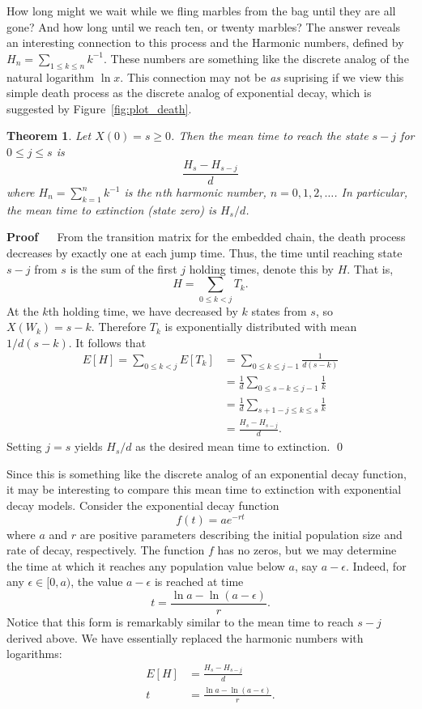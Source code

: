 \documentclass[12pt]{article}
\renewenvironment{proof}{%
\begin{adjustwidth}{\parindent}{\parindent}
{\bf Proof} \ \ 
}{\qed
\end{adjustwidth}}
\newtheorem{thm}{Theorem}[section]
\theoremstyle{definition}
\begin{document}
How long might we wait while we fling marbles from the bag until they are all
gone? And how long until we reach ten, or twenty marbles? The answer reveals an
interesting connection to this process and the Harmonic numbers, defined by
$H_n = \sum_{1 \leq k \leq n} k^{-1}$. These numbers are something like the
discrete analog of the natural logarithm $\ln{x}$. This connection may not be
\emph{as} suprising if we view this simple death process as the discrete analog
of exponential decay, which is suggested by Figure~\ref{fig:plot_death}.

\begin{thm}
    \label{thm:mean-death-time}
    Let $X(0) = s \geq 0$. Then the mean time to reach the state $s - j$ for $0
    \leq j \leq s$ is $$\frac{H_s - H_{s - j}}{d}$$ where $H_n = \sum_{k = 1}^n
    k^{-1}$ is the $n$th harmonic number, $n = 0, 1, 2, \dots$. In particular,
    the mean time to extinction (state zero) is $H_s/d$.
\end{thm}

\begin{proof}
From the transition matrix for the embedded chain, the death process decreases
by exactly one at each jump time. Thus, the time until reaching state $s - j$
from $s$ is the sum of the first $j$ holding times, denote this by $H$. That
is, $$H = \sum_{0 \leq k < j} T_k.$$ At the $k$th holding time, we have
decreased by $k$ states from $s$, so $X(W_k) = s - k$.  Therefore $T_k$ is
exponentially distributed with mean $1/d(s - k)$. It follows that
\begin{align*}
    E[H] = \sum_{0 \leq k < j} E[T_k]
         &= \sum_{0 \leq k \leq j - 1} \frac{1}{d (s - k)} \\
         &= \frac{1}{d} \sum_{0 \leq s - k \leq j - 1} \frac{1}{k} \\
         &= \frac{1}{d} \sum_{s + 1 - j \leq k \leq s} \frac{1}{k} \\
         &= \frac{H_s - H_{s - j}}{d}.
\end{align*}
Setting $j = s$ yields $H_s / d$ as the desired mean time to extinction.
\end{proof}

Since this is something like the discrete analog of an exponential decay
function, it may be interesting to compare this mean time to extinction with
exponential decay models. Consider the exponential decay function $$f(t) = a
e^{-rt}$$ where $a$ and $r$ are positive parameters describing the initial
population size and rate of decay, respectively. The function $f$ has no zeros,
but we may determine the time at which it reaches any population value below
$a$, say $a - \epsilon$. Indeed, for any $\epsilon \in [0, a)$, the value $a -
\epsilon$ is reached at time $$t = \frac{\ln{a} - \ln(a - \epsilon)}{r}.$$
Notice that this form is remarkably similar to the mean time to reach $s - j$
derived above. We have essentially replaced the harmonic numbers with
logarithms:
\begin{align*}
    E[H] &= \frac{H_s - H_{s - j}}{d} \\
    t &= \frac{\ln{a} - \ln(a - \epsilon)}{r}.
\end{align*}
\end{document}
